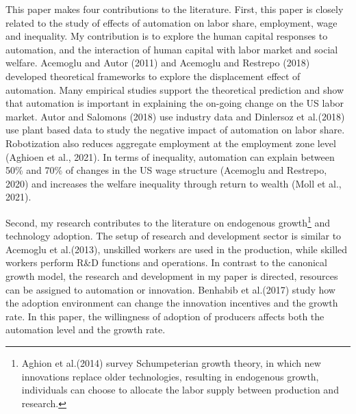 \documentclass[12pt]{article}
\begin{document}
This paper makes four contributions to the literature. First, this paper is closely related to the study of effects of automation on labor share, employment, wage and inequality. My contribution is to explore the human capital responses to automation, and the interaction of human capital with labor market and social welfare. Acemoglu and Autor (2011)\nocite{AcemogluAutor2011} and Acemoglu and Restrepo (2018)\nocite{AcemogluRestrepo2018} developed theoretical frameworks to explore the displacement effect of automation. Many empirical studies support the theoretical prediction and show that automation is important in explaining the on-going change on the US labor market. Autor and Salomons (2018)\nocite{AutorSalomons2018} use industry data and Dinlersoz et al.(2018)\nocite{Dinlersozetal2018} use plant based data to study the negative impact of automation on labor share. Robotization also reduces aggregate employment at the employment zone level (Aghioen et al., 2021\nocite{Aghioenetal2021}). In terms of inequality, automation can explain between 50\% and 70\% of changes in the US wage structure (Acemoglu and Restrepo, 2020\nocite{AcemogluRestrepo2020}) and increases the welfare inequality through return to wealth (Moll et al., 2021\nocite{Molletal2021}).

Second, my research contributes to the literature on endogenous growth\footnote{Aghion et al.(2014)\nocite{Aghionetal2014} survey Schumpeterian growth theory, in which new innovations replace older technologies, resulting in endogenous growth, individuals can choose to allocate the labor supply between production and research.} and technology adoption. The setup of research and development sector is similar to Acemoglu et al.(2013)\nocite{Acemogluetal2013}, unskilled workers are used in the production, while skilled workers perform R\&D functions and operations. In contrast to the canonical growth model, the research and development in my paper is directed, resources can be assigned to automation or innovation. Benhabib et al.(2017)\nocite{Benhabibetal2017} study how the adoption environment can change the innovation incentives and the growth rate. In this paper, the willingness of adoption of producers affects both the automation level and the growth rate. 
\end{document}
